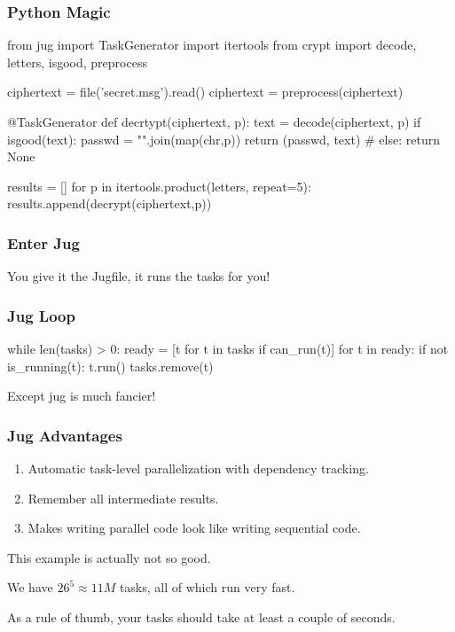 \documentclass{beamer}
\begin{document}
\begin{frame}[fragile]
\frametitle{Python Magic}

\begin{python}
from jug import TaskGenerator
import itertools
from crypt import decode, letters, isgood, preprocess

ciphertext = file('secret.msg').read()
ciphertext = preprocess(ciphertext)

@TaskGenerator
def decrtypt(ciphertext, p):
    text = decode(ciphertext, p)
    if isgood(text):
        passwd = "".join(map(chr,p))
        return (passwd, text)
    # else: return None

results = []
for p in itertools.product(letters, repeat=5):
    results.append(decrypt(ciphertext,p))

\end{python}

\end{frame}

\begin{frame}[fragile]
\frametitle{Enter Jug}

You give it the Jugfile, it runs the tasks for you!

\end{frame}

\begin{frame}[fragile]
\frametitle{Jug Loop}

\begin{python}
while len(tasks) > 0:
    ready = [t for t in tasks if can_run(t)]
    for t in ready:
        if not is_running(t):
            t.run()
        tasks.remove(t)
\end{python}

Except jug is much fancier!

\end{frame}

\begin{frame}[fragile]
\frametitle{Jug Advantages}
\begin{enumerate}
\item Automatic task-level parallelization with dependency tracking.
\item Remember all intermediate results.
\item Makes writing parallel code look like writing sequential code.
\end{enumerate}
\end{frame}

\begin{frame}[fragile]
This example is actually not so good.

We have $26^5 \approx 11M$ tasks, all of which run very fast.

As a rule of thumb, your tasks should take at least a couple of seconds.
\end{frame}
\end{document}

